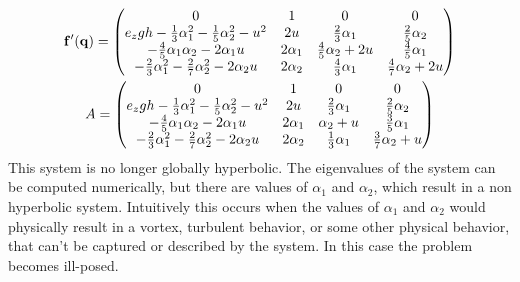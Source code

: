   \begin{gather}
    \mathbf{f}'(\mathbf{q}) =
    \begin{pmatrix}
      0 & 1 & 0 & 0 \\
      e_{z} g h - \frac{1}{3} \alpha_{1}^{2} - \frac{1}{5} \alpha_{2}^{2} - u^{2} & 2 u & \frac{2}{3} \alpha_{1} & \frac{2}{5} \alpha_{2} \\
      -\frac{4}{5} \alpha_{1} \alpha_{2} - 2 \alpha_{1} u & 2 \alpha_{1} & \frac{4}{5} \alpha_{2} + 2 u & \frac{4}{5} \alpha_{1} \\
      -\frac{2}{3} \alpha_{1}^{2} - \frac{2}{7} \alpha_{2}^{2} - 2 \alpha_{2} u & 2 \alpha_{2} & \frac{4}{3} \alpha_{1} & \frac{4}{7} \alpha_{2} + 2 u
    \end{pmatrix} \\
    A =
    \begin{pmatrix}
      0 & 1 & 0 & 0 \\
      e_{z} g h - \frac{1}{3} \alpha_{1}^{2} - \frac{1}{5} \alpha_{2}^{2} - u^{2} & 2 u & \frac{2}{3} \alpha_{1} & \frac{2}{5} \alpha_{2} \\
      -\frac{4}{5} \alpha_{1} \alpha_{2} - 2 \alpha_{1} u & 2 \alpha_{1} & \alpha_{2} + u & \frac{3}{5} \alpha_{1} \\
      -\frac{2}{3} \alpha_{1}^{2} - \frac{2}{7} \alpha_{2}^{2} - 2 \alpha_{2} u & 2 \alpha_{2} & \frac{1}{3} \alpha_{1} & \frac{3}{7} \alpha_{2} + u
    \end{pmatrix}
  \end{gather}
  This system is no longer globally hyperbolic.
  The eigenvalues of the system can be computed numerically, but there are values of
  \(\alpha_1\) and \(\alpha_2\), which result in a non hyperbolic system.
  Intuitively this occurs when the values of \(\alpha_1\) and \(\alpha_2\) would
  physically result in a vortex, turbulent behavior, or some other physical behavior,
  that can't be captured or described by the system.
  In this case the problem becomes ill-posed.

